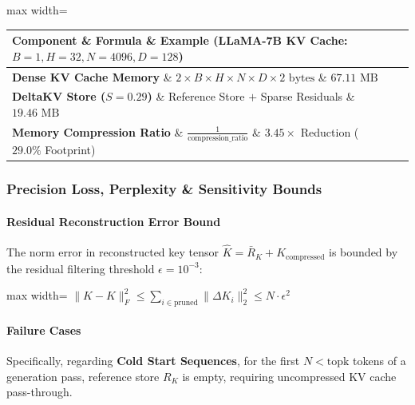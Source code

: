 \begin{center}
\begin{adjustbox}{max width=\columnwidth}
\renewcommand{\arraystretch}{1.2}
\begin{tabular}{lll}
\toprule
Component \& Formula \& Example (LLaMA-7B KV Cache: $B=1, H=32, N=4096, D=128$) \\
\midrule
\textbf{Dense KV Cache Memory} \& $2 \times B \times H \times N \times D \times 2 \text{ bytes}$ \& $67.11 \text{ MB}$ \\
\textbf{DeltaKV Store ($S=0.29$)} \& Reference Store $+$ Sparse Residuals \& $19.46 \text{ MB}$ \\
\textbf{Memory Compression Ratio} \& $\frac{1}{\text{compression\_ratio}}$ \& $\mathbf{3.45\times}$ Reduction ($29.0\%$ Footprint) \\

\bottomrule
\end{tabular}
\end{adjustbox}
\end{center}

\subsubsection*{Precision Loss, Perplexity \& Sensitivity Bounds}

\paragraph{Residual Reconstruction Error Bound}

The norm error in reconstructed key tensor $\widehat{K} = \bar{R}_K + K_{\text{compressed}}$ is bounded by the residual filtering threshold $\epsilon = 10^{-3}$:

\begin{center}
\begin{adjustbox}{max width=\columnwidth}
$\displaystyle
\| K - \widehat{K} \|_F^2 \le \sum_{i \in \text{pruned}} \| \Delta K_i \|_2^2 \le N \cdot \epsilon^2
$
\end{adjustbox}
\end{center}

\paragraph{Failure Cases}

Specifically, regarding \textbf{Cold Start Sequences}, for the first $N < \text{topk}$ tokens of a generation pass, reference store $R_K$ is empty, requiring uncompressed KV cache pass-through.



